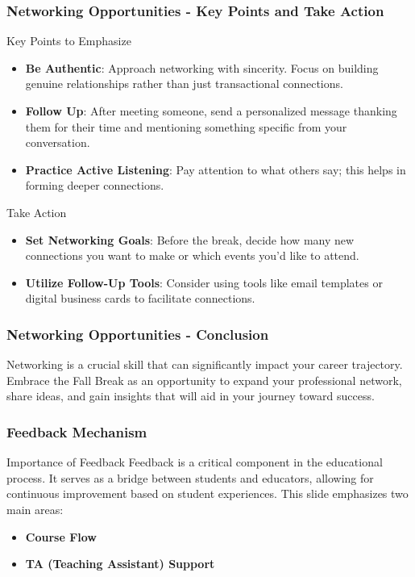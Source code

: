 \documentclass[aspectratio=169]{beamer}
\begin{document}
\begin{frame}[fragile]
    \frametitle{Networking Opportunities - Key Points and Take Action}
    \begin{block}{Key Points to Emphasize}
        \begin{itemize}
            \item \textbf{Be Authentic}: Approach networking with sincerity. Focus on building genuine relationships rather than just transactional connections.
            \item \textbf{Follow Up}: After meeting someone, send a personalized message thanking them for their time and mentioning something specific from your conversation.
            \item \textbf{Practice Active Listening}: Pay attention to what others say; this helps in forming deeper connections.
        \end{itemize}
    \end{block}
    \begin{block}{Take Action}
        \begin{itemize}
            \item \textbf{Set Networking Goals}: Before the break, decide how many new connections you want to make or which events you’d like to attend.
            \item \textbf{Utilize Follow-Up Tools}: Consider using tools like email templates or digital business cards to facilitate connections.
        \end{itemize}
    \end{block}
\end{frame}

\begin{frame}[fragile]
    \frametitle{Networking Opportunities - Conclusion}
    Networking is a crucial skill that can significantly impact your career trajectory. Embrace the Fall Break as an opportunity to expand your professional network, share ideas, and gain insights that will aid in your journey toward success.
\end{frame}

\begin{frame}[fragile]
    \frametitle{Feedback Mechanism}
    \begin{block}{Importance of Feedback}
        Feedback is a critical component in the educational process. It serves as a bridge between students and educators, allowing for continuous improvement based on student experiences. 
        This slide emphasizes two main areas:
        \begin{itemize}
            \item \textbf{Course Flow}
            \item \textbf{TA (Teaching Assistant) Support}
        \end{itemize}
    \end{block}
\end{frame}
\end{document}
